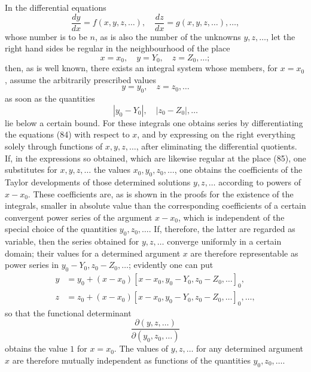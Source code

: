 \documentclass[11pt,a4paper,leqno]{article}
\begin{document}
In the differential equations
\begin{equation}\tag{84}
\frac{dy}{dx}=f(x,y,z,\ldots),\quad
\frac{dz}{dx}=g(x,y,z,\ldots),\ldots,
\end{equation}
whose number is to be $n$, as is also the number of the unknowns $y,z,\ldots$, let the right hand sides be regular in the neighbourhood of the place
\begin{equation}\tag{85}
x=x_0,\quad y=Y_0,\quad z=Z_0,\ldots;
\end{equation}
then, as is well known, there exists an integral system whose members, for $x=x_0$, assume the arbitrarily prescribed values
\[
y=y_0,\quad z=z_0,\ldots
\]
as soon as the quantities
\[
|y_0-Y_0|,\quad |z_0-Z_0|,\ldots
\]
lie below a certain bound. For these integrals one obtains series by differentiating the equations (84) with respect to $x$, and by expressing on the right everything solely through functions of $x,y,z,\ldots$, after eliminating the differential quotients. If, in the expressions so obtained, which are likewise regular at the place (85), one substitutes for $x,y,z,\ldots$ the values $x_0,y_0,z_0,\ldots$, one obtains the coefficients of the Taylor developments of those determined solutions $y,z,\ldots$ according to powers of $x-x_0$. These coefficients are, as is shown in the proofs for the existence of the integrals, smaller in absolute value than the corresponding coefficients of a certain convergent power series of the argument $x-x_0$, which is independent of the special choice of the quantities $y_0,z_0,\ldots$. If, therefore, the latter are regarded as variable, then the series obtained for $y,z,\ldots$ converge uniformly in a certain domain; their values for a determined argument $x$ are therefore representable as power series in $y_0-Y_0,z_0-Z_0,\ldots$; evidently one can put
\[
\begin{aligned}
y&=y_0+(x-x_0)[x-x_0,y_0-Y_0,z_0-Z_0,\ldots]_0,\\
z&=z_0+(x-x_0)[x-x_0,y_0-Y_0,z_0-Z_0,\ldots]_0,\ldots,
\end{aligned}
\]
so that the functional determinant
\[
\frac{\partial(y,z,\ldots)}{\partial(y_0,z_0,\ldots)}
\]
obtains the value $1$ for $x=x_0$. The values of $y,z,\ldots$ for any determined argument $x$ are therefore mutually independent as functions of the quantities $y_0,z_0,\ldots$.
\end{document}
